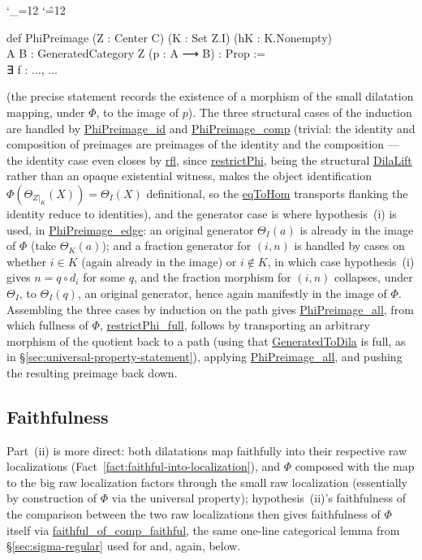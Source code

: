 \documentclass[11pt]{amsart}
\newcommand{\lc}[1]{\url{#1}}
\newenvironment{leancode}{%
  \begingroup
  \catcode`\_=12\relax
  \catcode`\^=12\relax
  \small\ttfamily\raggedright\baselineskip=1.15\baselineskip
  \par\smallskip\noindent
}{%
  \par\smallskip
  \endgroup
}
\theoremstyle{plain}
\theoremstyle{definition}
\theoremstyle{remark}
\begin{document}
\begin{leancode}
def PhiPreimage (Z : Center C) (K : Set Z.I) (hK : K.Nonempty) \\
    {A B : GeneratedCategory Z} (p : A ⟶ B) : Prop := \\
  ∃ f : ..., ...
\end{leancode}
(the precise statement records the existence of a morphism of the small dilatation mapping,
under $\Phi$, to the image of $p$). The three structural cases of the induction are handled
by \lc{PhiPreimage_id} and \lc{PhiPreimage_comp} (trivial: the identity and composition of
preimages are preimages of the identity and the composition --- the identity case even closes
by \lc{rfl}, since \lc{restrictPhi}, being the structural \lc{DilaLift} rather than an opaque
existential witness, makes the object identification $\Phi(\Theta_{Z|_K}(X)) = \Theta_I(X)$
definitional, so the \lc{eqToHom} transports flanking the identity reduce to identities), and
the generator case is where
hypothesis~(i) is used, in \lc{PhiPreimage_edge}: an original generator $\Theta_I(a)$ is
already in the image of $\Phi$ (take $\Theta_K(a)$); and a fraction generator for $(i,n)$ is
handled by cases on whether $i \in K$ (again already in the image) or $i \notin K$, in which
case hypothesis~(i) gives $n = q \circ d_i$ for some $q$, and the fraction morphism for
$(i,n)$ collapses, under $\Theta_I$, to $\Theta_I(q)$, an original generator, hence again
manifestly in the image of $\Phi$. Assembling the three cases by induction on the path
gives \lc{PhiPreimage\_all}, from which fullness
of $\Phi$, \lc{restrictPhi_full}, follows by transporting an arbitrary morphism of the
quotient back to a path (using that \lc{GeneratedToDila} is full, as in
\S\ref{sec:universal-property-statement}), applying \lc{PhiPreimage\_all}, and pushing the
resulting preimage back down.

\subsection{Faithfulness}

Part~(ii) is more direct: both dilatations map faithfully into their respective raw
localizations (Fact~\ref{fact:faithful-into-localization}), and $\Phi$ composed with the map
to the big raw localization factors through the small raw localization (essentially by
construction of $\Phi$ via the universal property); hypothesis~(ii)'s faithfulness of the
comparison between the two raw localizations then gives faithfulness of $\Phi$ itself via
\lc{faithful_of_comp_faithful}, the same one-line categorical lemma from
\S\ref{sec:sigma-regular} used for \citep[Fact~3.7]{Mayeux} and, again, below.
\end{document}
